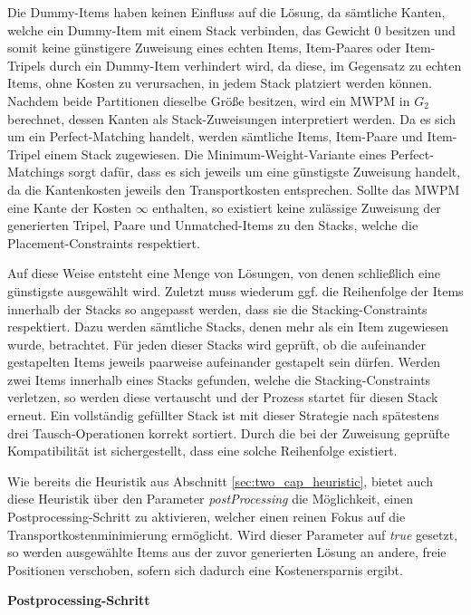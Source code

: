 Die Dummy-Items haben keinen Einfluss auf die Lösung, da sämtliche Kanten, welche ein Dummy-Item mit einem Stack verbinden,
das Gewicht $0$ besitzen und somit keine günstigere Zuweisung eines echten Items, Item-Paares oder Item-Tripels durch ein Dummy-Item verhindert wird, da diese, im Gegensatz zu echten Items, ohne Kosten zu verursachen, in jedem Stack platziert
werden können. Nachdem beide Partitionen dieselbe Größe besitzen, wird ein \textsc{MWPM} in $G_2$ berechnet, dessen Kanten
als Stack-Zuweisungen interpretiert werden. Da es sich um ein Perfect-Matching handelt, werden sämtliche Items, Item-Paare
und Item-Tripel einem Stack zugewiesen. Die Minimum-Weight-Variante eines Perfect-Matchings sorgt dafür, dass es sich
jeweils um eine günstigste Zuweisung handelt, da die Kantenkosten jeweils den Transportkosten entsprechen.
Sollte das \textsc{MWPM} eine Kante der Kosten $\infty$ enthalten, so existiert keine zulässige Zuweisung
der generierten Tripel, Paare und Unmatched-Items zu den Stacks, welche die Placement-Constraints respektiert.

Auf diese Weise entsteht eine Menge von Lösungen, von denen schließlich eine günstigste ausgewählt wird.
Zuletzt muss wiederum ggf. die Reihenfolge der Items innerhalb der Stacks so angepasst werden,
dass sie die Stacking-Constraints respektiert. Dazu werden sämtliche Stacks, denen mehr als
ein Item zugewiesen wurde, betrachtet. Für jeden dieser Stacks wird geprüft, ob die aufeinander
gestapelten Items jeweils paarweise aufeinander gestapelt sein dürfen.
Werden zwei Items innerhalb eines Stacks gefunden, welche die Stacking-Constraints verletzen, so werden diese
vertauscht und der Prozess startet für diesen Stack erneut. Ein vollständig gefüllter Stack ist mit dieser
Strategie nach spätestens drei Tausch-Operationen korrekt sortiert. Durch die bei der Zuweisung geprüfte
Kompatibilität ist sichergestellt, dass eine solche Reihenfolge existiert.

Wie bereits die Heuristik aus Abschnitt \ref{sec:two_cap_heuristic}, bietet auch diese Heuristik über den Parameter
\textit{postProcessing} die Möglichkeit, einen Postprocessing-Schritt zu aktivieren, welcher einen reinen Fokus
auf die Transportkostenminimierung ermöglicht. Wird dieser Parameter auf \textit{true} gesetzt, so werden ausgewählte Items aus der zuvor generierten Lösung an andere, freie Positionen verschoben, sofern sich dadurch eine Kostenersparnis ergibt.\newline

\textbf{Postprocessing-Schritt}

